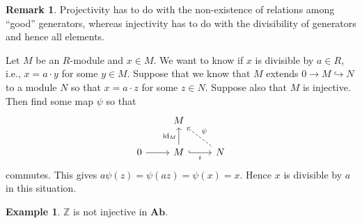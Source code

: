 \documentclass[10pt,letterpaper,cm]{nupset}
\theoremstyle{definition}
\newtheorem{exmp}{Example}
\newtheorem{remark}{Remark}
\newcommand{\Z}{\mathbb Z}
\newcommand{\1}{\mathbf{1}}
\newcommand{\0}{\vec 0}
\DeclareMathOperator{\id}{id}
\begin{document}
\begin{remark}
Projectivity has to do with the non-existence of relations among ``good'' generators, whereas injectivity has to do with the divisibility of generators and hence all elements.

Let $M$ be an $R$-module and $x\in M$. We want to know if $x$ is divisible by $a\in R$, i.e., $x = a \cdot y$ for some $y\in M$. Suppose that we know that $M$ extends $0 \to M \hookrightarrow N$ to a module $N$ so that $x = a \cdot z$ for some $z \in N$. Suppose also that $M$ is injective. Then find  some map $\psi$ so that 
\[
\begin{tikzcd}
 & M &  \\
0 \arrow[r] & M \arrow[r, "i"', hook] \arrow[u, "\id_M"] & N \arrow[lu, "\psi"', dashed]
\end{tikzcd}
\] commutes. This gives $a\psi(z) = \psi(az) = \psi(x) = x$. Hence $x$ is divisible by $a$ in this situation.
\end{remark}

\begin{exmp}
$\Z$ is not injective in $\mathbf{Ab}$.
\end{exmp}
\end{document}
